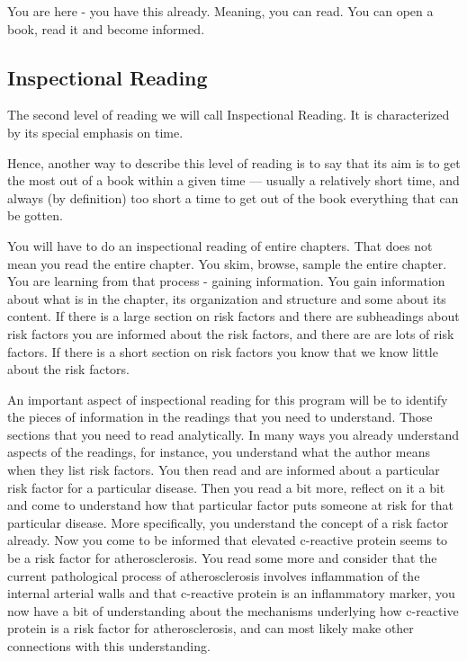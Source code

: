 You are here - you have this already. Meaning, you can read. You can open a book, read it and become informed.

\subsection{Inspectional Reading}
\begin{displayquote}
The second level of reading we will call Inspectional Reading. It is characterized by its special emphasis on time. 
\end{displayquote}

Hence, another way to describe this level of reading is to say that its aim is to get the most out of a book within a given time — usually a relatively short time, and always (by definition) too short a time to get out of the book everything that can be gotten.

You will have to do an inspectional reading of entire chapters. That does not mean you read the entire chapter. You skim, browse, sample the entire chapter. You are learning from that process - gaining information. You gain information about what is in the chapter, its organization and structure and some about its content. If there is a large section on risk factors and there are subheadings about risk factors you are informed about the risk factors, and there are are lots of risk factors. If there is a short section on risk factors you know that we know little about the risk factors. 

An important aspect of inspectional reading for this program will be to identify the pieces of information in the readings that you need to understand. Those sections that you need to read analytically. In many ways you already understand aspects of the readings, for instance, you understand what the author means when they list risk factors. You then read and are informed about a particular risk factor for a particular disease. Then you read a bit more, reflect on it a bit and come to understand how that particular factor puts someone at risk for that particular disease. More specifically, you understand the concept of a risk factor already. Now you come to be informed that elevated c-reactive protein seems to be a risk factor for atherosclerosis. You read some more and consider that the current pathological process of atherosclerosis involves inflammation of the internal arterial walls and that c-reactive protein is an inflammatory marker, you now have a bit of understanding about the mechanisms underlying how c-reactive protein is a risk factor for atherosclerosis, and can most likely make other connections with this understanding.

